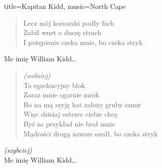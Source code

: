 \begin{song}{title={Kapitan Kidd}, music={North Cape}}
\begin{multicols}{2}
\begin{verse}
        Lecz mój korsarski podły fach \\
        Zabił wnet o duszę strach \\
        I potępienie czeka mnie, bo czeka stryk
    \end{verse}
    \begin{chorus}
        Me imię William Kidd\ldots
    \end{chorus}
    \begin{verse}
        \textit{(wolniej)} \\
        To egzekucyjny blok \\
        Zaraz mnie ogarnie mrok \\
        Bo na mą szyję kat założy gruby sznur \\
        Więc dzisiaj ostrzec ciebie chcę \\
        Byś za przykład nie brał mnie \\
        Mądrości drogą zawsze szedł, bo czeka stryk
    \end{verse}
    \begin{chorus}
        \textit{(szybciej)} \\
        Me imię William Kidd\ldots
    \end{chorus}
\end{multicols}
\end{song}
\newpage

